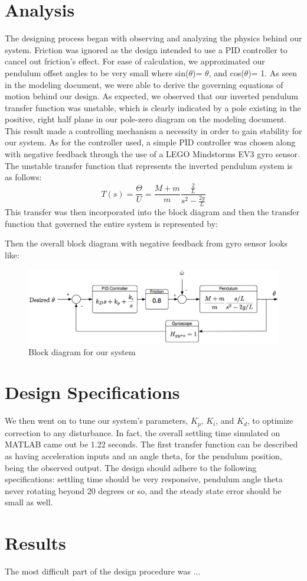 \documentclass{notes}
\begin{document}
\section{Analysis}  
The designing process began with observing and analyzing the physics behind our system. Friction was ignored as the design intended to use a PID controller to cancel out friction's effect. For ease of calculation, we approximated our pendulum offset angles to be very small where sin($\theta$)= $\theta$, and cos($\theta$)= 1. As seen in the modeling document, we were able to derive the governing equations of motion behind our design. As expected, we observed that our inverted pendulum transfer function was unstable, which is clearly indicated by a pole existing in the positive, right half plane in our pole-zero diagram on the modeling document. This result made a controlling mechanism a necessity in order to gain stability for our system. As for the controller used, a simple PID controller was chosen along with negative feedback through the use of a LEGO Mindstorms EV3 gyro sensor. The unstable transfer function that represents the inverted pendulum system is as follows:
\[
  T(s) = \dfrac{\Theta}{U} = \dfrac{M+m}{m}\dfrac{\frac{2}{L}}{s^2-\frac{2g}{L}}
\]
This  transfer was then incorporated into the block diagram and then the transfer function that governed the entire system is represented by:

Then the overall block diagram with negative feedback from gyro sensor looks like:
\begin{figure}[!h]
  \begin{center}
    \includegraphics[width=5 in]{pics/Block_Diagram_2.eps}
  \end{center}
  \caption{Block diagram for our system}
  \label{fig:block_diagram}
\end{figure}

\section{Design Specifications}
We then went on to tune our system's parameters, $K_p$, $K_i$, and $K_d$, to optimize correction to any disturbance. In fact, the overall settling time simulated on MATLAB came out be 1.22 seconds. 
The first transfer function can be described as having acceleration inputs and an angle theta, for the pendulum position, being the observed output. The design should adhere to the following specifications: settling time should be very responsive, pendulum angle theta never rotating beyond 20 degrees or so, and the steady state error should be small as well.  

 \section{Results}
The most difficult part of the design procedure was ... 
   
\end{document}
